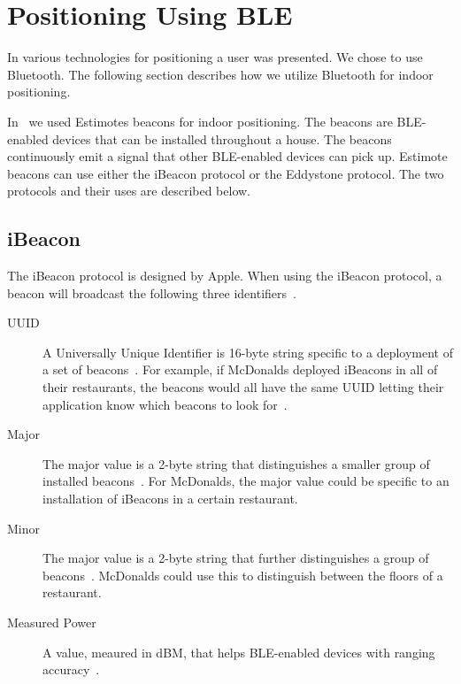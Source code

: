 \section{Positioning Using BLE}
\label{sec:design:ble-positioning}

In  various technologies for positioning a user was presented. We chose to use Bluetooth. The following section describes how we utilize Bluetooth for indoor positioning.

In~\cite{prespecialisation} we used Estimotes beacons for indoor positioning. The beacons are BLE-enabled devices that can be installed throughout a house. The beacons continuously emit a signal that other BLE-enabled devices can pick up.
Estimote beacons can use either the iBeacon protocol or the Eddystone protocol. The two protocols and their uses are described below.

\subsection{iBeacon}

The iBeacon protocol is designed by Apple. When using the iBeacon protocol, a beacon will broadcast the following three identifiers~\cite[ch. 1]{gilchrist2014learning}.

\begin{description}
\item[UUID] A Universally Unique Identifier is 16-byte string specific to a deployment of a set of beacons~\cite{estimote:what-is-ibeacon}. For example, if McDonalds deployed iBeacons in all of their restaurants, the beacons would all have the same UUID letting their application know which beacons to look for~\cite[ch. 1]{gilchrist2014learning}.
\item[Major] The major value is a 2-byte string that distinguishes a smaller group of installed beacons~\cite[ch. 1]{gilchrist2014learning}\cite{estimote:what-is-ibeacon}. For McDonalds, the major value could be specific to an installation of iBeacons in a certain restaurant.
\item[Minor] The major value is a 2-byte string that further distinguishes a group of beacons~\cite[ch. 1]{gilchrist2014learning}\cite{estimote:what-is-ibeacon}. McDonalds could use this to distinguish between the floors of a restaurant.
\item[Measured Power] A value, meaured in dBM, that helps BLE-enabled devices with ranging accuracy~\cite{apple:proximity-beacon-spec}.
\end{description}

